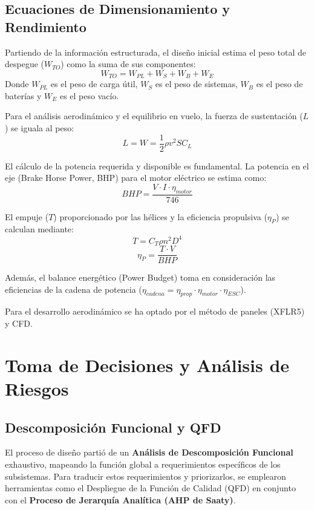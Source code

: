 \documentclass[12pt,a4paper]{article}
\begin{document}
\subsection{Ecuaciones de Dimensionamiento y Rendimiento}
Partiendo de la información estructurada, el diseño inicial estima el peso total de despegue ($W_{TO}$) como la suma de sus componentes:
\begin{equation}
    W_{TO} = W_{PL} + W_{S} + W_{B} + W_{E}
\end{equation}
Donde $W_{PL}$ es el peso de carga útil, $W_S$ es el peso de sistemas, $W_B$ es el peso de baterías y $W_E$ es el peso vacío.

Para el análisis aerodinámico y el equilibrio en vuelo, la fuerza de sustentación ($L$) se iguala al peso:
\begin{equation}
    L = W = \frac{1}{2} \rho v^2 S C_L
\end{equation}

El cálculo de la potencia requerida y disponible es fundamental. La potencia en el eje (Brake Horse Power, BHP) para el motor eléctrico se estima como:
\begin{equation}
    BHP = \frac{V \cdot I \cdot \eta_{motor}}{746}
\end{equation}

El empuje ($T$) proporcionado por las hélices y la eficiencia propulsiva ($\eta_P$) se calculan mediante:
\begin{equation}
    T = C_T \rho n^2 D^4
\end{equation}
\begin{equation}
    \eta_P = \frac{T \cdot V}{BHP}
\end{equation}

Además, el balance energético (Power Budget) toma en consideración las eficiencias de la cadena de potencia ($\eta_{cadena} = \eta_{prop} \cdot \eta_{motor} \cdot \eta_{ESC}$).

Para el desarrollo aerodinámico se ha optado por el método de paneles (XFLR5) y CFD. 

\section{Toma de Decisiones y Análisis de Riesgos}

\subsection{Descomposición Funcional y QFD}
El proceso de diseño partió de un \textbf{Análisis de Descomposición Funcional} exhaustivo, mapeando la función global a requerimientos específicos de los subsistemas. Para traducir estos requerimientos y priorizarlos, se emplearon herramientas como el Despliegue de la Función de Calidad (QFD) en conjunto con el \textbf{Proceso de Jerarquía Analítica (AHP de Saaty)}. 
\end{document}
